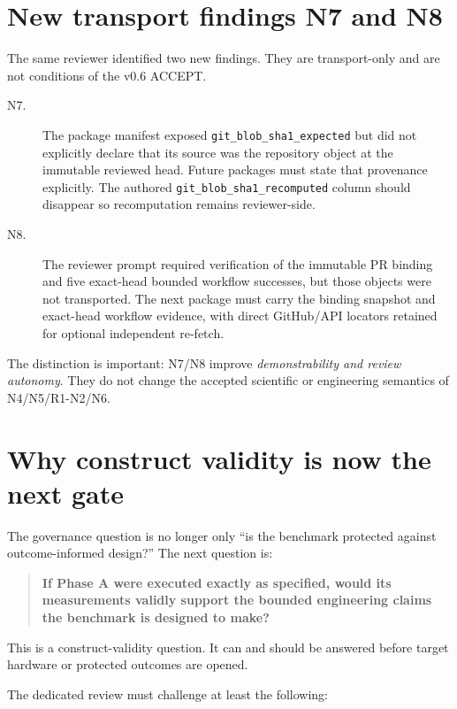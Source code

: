 \documentclass[10pt,a4paper]{article}
\newcommand{\code}[1]{\texttt{#1}}
\begin{document}
\section{New transport findings N7 and N8}

The same reviewer identified two new findings. They are transport-only and are not conditions of the v0.6 ACCEPT.

\begin{description}
\item[N7.] The package manifest exposed \code{git\_blob\_sha1\_expected} but did not explicitly declare that its source
was the repository object at the immutable reviewed head. Future packages must state that provenance explicitly.
The authored \code{git\_blob\_sha1\_recomputed} column should disappear so recomputation remains reviewer-side.

\item[N8.] The reviewer prompt required verification of the immutable PR binding and five exact-head bounded workflow
successes, but those objects were not transported. The next package must carry the binding snapshot and exact-head
workflow evidence, with direct GitHub/API locators retained for optional independent re-fetch.
\end{description}

The distinction is important: N7/N8 improve \emph{demonstrability and review autonomy}. They do not change the accepted
scientific or engineering semantics of N4/N5/R1-N2/N6.

\section{Why construct validity is now the next gate}

The governance question is no longer only ``is the benchmark protected against outcome-informed design?'' The next
question is:

\begin{quote}
\textbf{If Phase A were executed exactly as specified, would its measurements validly support the bounded engineering
claims the benchmark is designed to make?}
\end{quote}

This is a construct-validity question. It can and should be answered before target hardware or protected outcomes are
opened.

The dedicated review must challenge at least the following:
\end{document}
